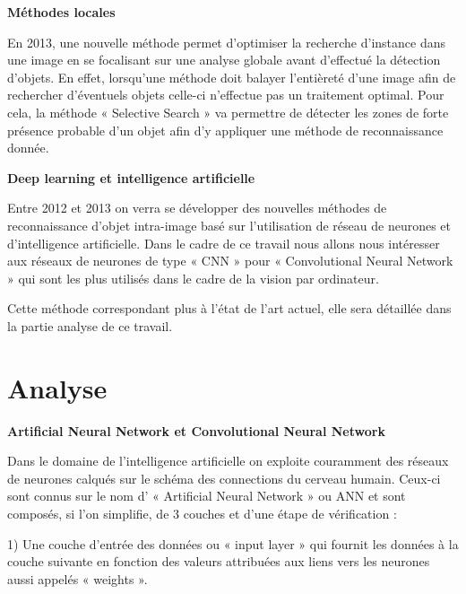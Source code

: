 \documentclass[a4paper,12pt]{article} %
\begin{document}
\newpage
\textbf{Méthodes locales}\newline
\par
En 2013, une nouvelle méthode permet d’optimiser la recherche d’instance dans une image en se focalisant sur une analyse globale avant d'effectué la détection d'objets. En effet, lorsqu’une méthode doit balayer l’entièreté d’une image afin de rechercher d’éventuels objets celle-ci n’effectue pas un traitement optimal. Pour cela, la méthode « Selective Search » va permettre de détecter les zones de forte présence probable d’un objet afin d’y appliquer une méthode de reconnaissance donnée. \newline

\textbf{Deep learning et intelligence artificielle}\newline
\par
Entre 2012 et 2013 on verra se développer des nouvelles méthodes de reconnaissance d’objet intra-image basé sur l’utilisation de réseau de neurones et d’intelligence artificielle. Dans le cadre de ce travail nous allons nous intéresser aux réseaux de neurones de type « CNN » pour « Convolutional Neural Network » qui sont les plus utilisés dans le cadre de la vision par ordinateur.\newline
\par
Cette méthode correspondant plus à l’état de l’art actuel, elle sera détaillée dans la partie analyse de ce travail.  \newline

\newpage
\section{Analyse} %

\textbf{Artificial Neural Network et Convolutional Neural Network}\newline
\par
Dans le domaine de l’intelligence artificielle on exploite couramment des réseaux de neurones calqués sur le schéma des connections du cerveau humain. Ceux-ci sont connus sur le nom d’ « Artificial Neural Network » ou ANN et sont composés, si l’on simplifie, de 3 couches et d'une étape de vérification :\newline

1)	Une couche d’entrée des données ou « input layer » qui fournit les données à la couche suivante en fonction des valeurs attribuées aux liens vers les neurones aussi appelés « weights ».\newline
\end{document}
